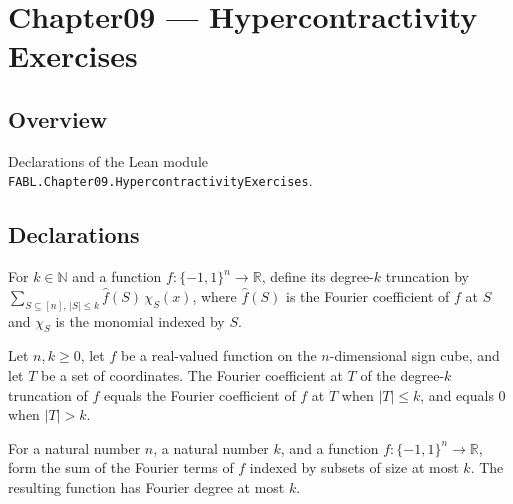 \chapter{Chapter09 — Hypercontractivity Exercises}
\section{Overview}

Declarations of the Lean module \texttt{FABL.Chapter09.HypercontractivityExercises}.

\section{Declarations}

\begin{definition}
\label{FABL.degreeTruncation}
\leanok
{}
For $k\in\mathbb{N}$ and a function $f:\{-1,1\}^n\to\mathbb{R}$, define its degree-$k$
truncation by $\sum_{S\subseteq[n],\,|S|\le k}\widehat f(S)\,\chi_S(x)$, where $\widehat
f(S)$ is the Fourier coefficient of $f$ at $S$ and $\chi_S$ is the monomial indexed by
$S$.
\end{definition}

\begin{theorem}
\label{FABL.fourierCoeff_degreeTruncation}
\leanok
{}
Let $n,k\ge 0$, let $f$ be a real-valued function on the $n$-dimensional sign cube, and
let $T$ be a set of coordinates. The Fourier coefficient at $T$ of the degree-$k$
truncation of $f$ equals the Fourier coefficient of $f$ at $T$ when $|T|\le k$, and
equals $0$ when $|T|>k$.
\end{theorem}

\begin{theorem}
\label{FABL.fourierDegree_degreeTruncation_le}
\leanok
{}
For a natural number $n$, a natural number $k$, and a function
$f\colon\{-1,1\}^n\to\mathbb{R}$, form the sum of the Fourier terms of $f$ indexed by
subsets of size at most $k$. The resulting function has Fourier degree at most $k$.
\end{theorem}

